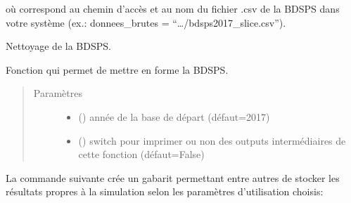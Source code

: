 \documentclass[letterpaper,10pt,french]{sphinxmanual}
\begin{document}
où  correspond au chemin d’accès et au nom du fichier .csv de la BDSPS dans votre système (ex.: donnees\_brutes = “…/bdsps2017\_slice.csv”).


\begin{fulllineitems}
\label{\detokenize{utilisation:simgen.bdsps}}
Nettoyage de la BDSPS.

Fonction qui permet de mettre en forme la BDSPS.
\begin{quote}\begin{description}
\item[{Paramètres}] \leavevmode\begin{itemize}
\item {} 
 () \textendash{} année de la base de départ (défaut=2017)

\item {} 
 () \textendash{} switch pour imprimer ou non des outputs intermédiaires de cette fonction (défaut=False)

\end{itemize}

\end{description}\end{quote}

\end{fulllineitems}


\begin{DUlineblock}{0em}
\item[] 
\end{DUlineblock}


La commande suivante crée un gabarit permettant entre autres de stocker les résultats propres à la simulation selon les paramètres d’utilisation choisis:
\end{document}

